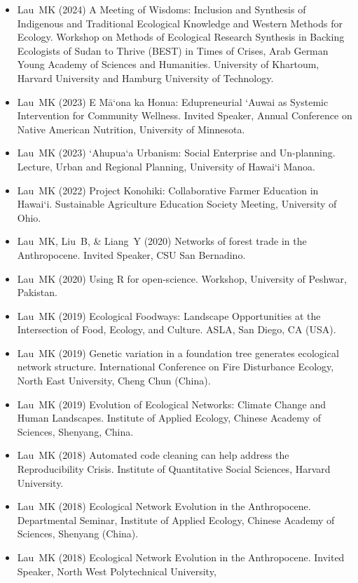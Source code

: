 \documentclass[a4paper]{article}
\begin{document}
\begin{itemize}
\item Lau~MK (2024) A Meeting of Wisdoms: Inclusion and Synthesis of
  Indigenous and Traditional Ecological Knowledge and Western Methods
  for Ecology. Workshop on Methods of Ecological Research
  Synthesis in Backing Ecologists of Sudan to Thrive (BEST) in Times of
  Crises, Arab German Young Academy of Sciences and
  Humanities. University of Khartoum, Harvard University and Hamburg
  University of Technology.
\item Lau~MK (2023) E M\={a}‘ona ka Honua: Edupreneurial ‘Auwai as
  Systemic Intervention for Community Wellness. Invited Speaker,
  Annual Conference on Native American Nutrition, University of Minnesota. 
\item Lau~MK (2023) ‘Ahupua‘a Urbanism: Social Enterprise and
  Un-planning. Lecture, Urban and Regional Planning, University of
  Hawai‘i Manoa.  
\item Lau~MK (2022) Project Konohiki: Collaborative Farmer Education
  in Hawai‘i. Sustainable Agriculture Education Society
  Meeting, University of Ohio. 
\item Lau~MK, Liu~B, \& Liang~Y (2020) Networks of forest trade in the
  Anthropocene. Invited Speaker, CSU San Bernadino.
\item Lau~MK (2020) Using R for open-science. Workshop, University of
  Peshwar, Pakistan. 
\item Lau~MK (2019) Ecological Foodways: Landscape Opportunities at
  the Intersection of Food, Ecology, and Culture. ASLA, San Diego, CA
  (USA).
\item Lau~MK (2019) Genetic variation in a foundation tree generates
  ecological network structure. International Conference on Fire
  Disturbance Ecology, North East University, Cheng Chun (China).
\item Lau~MK (2019) Evolution of Ecological Networks: Climate Change
  and Human Landscapes. Institute of Applied Ecology, Chinese Academy
  of Sciences, Shenyang, China.
\item Lau~MK (2018) Automated code cleaning can help address the
  Reproducibility Crisis. Institute of Quantitative Social Sciences,
  Harvard University.
\item Lau~MK (2018) Ecological Network Evolution in the
  Anthropocene. Departmental Seminar, Institute of Applied Ecology,
  Chinese Academy of Sciences, Shenyang (China).
\item Lau~MK (2018) Ecological Network Evolution in the
  Anthropocene. Invited Speaker, North West Polytechnical University,

\end{itemize}
\end{document}
